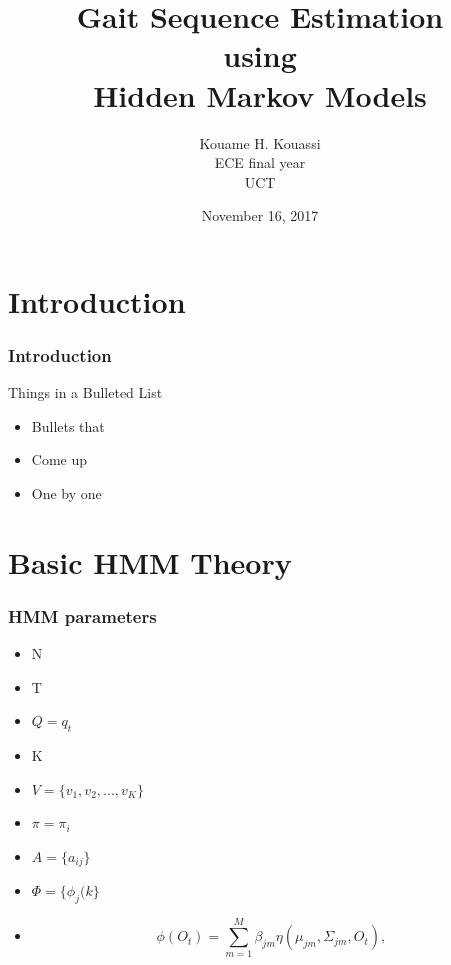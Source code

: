 \documentclass[serif,mathserif]{beamer}
\author[Kouame Kouassi]{Kouame H. Kouassi\\ \quad ECE final year\\ \quad UCT}
\title[Short Title\hspace{2em}\insertframenumber/\inserttotalframenumber]{Gait Sequence Estimation \\using \\Hidden Markov Models}
\date{November 16, 2017} %
\institute{Final year project presentation}
\begin{document}
\maketitle

 \section{Introduction}  %


\begin{frame}
  \frametitle{Introduction}
  Things in a Bulleted List\pause
  \begin{itemize}
  \item Bullets that\pause
  \item Come up\pause
  \item One by one %
  \end{itemize}
\end{frame}

\section{Basic HMM Theory} %

\begin{frame}
  \frametitle{HMM parameters}
  \begin{itemize}
  	\item N  \pause%
  	\item T \pause%
  	\item \(Q = {q_t}\) \pause%
  	\item K \pause%
  	\item \(V = \{v_1, v_2, ..., v_K\}\) \pause%
  	\item \(\pi = {\pi_i}\) \pause 	 %
  	\item \(A =  \{a_{ij} \}\) \pause%
  	\item \(\Phi =   \{ \phi_{j}(k\}\) \pause%
  	\item 
    \begin{equation*}
      	\phi(O_t) = \sum_{m=1}^M \beta_{jm} \eta(\mu_{jm}, \Sigma_{jm}, O_t), \label{eq:phi}
    \end{equation*}
  \end{itemize}
\end{frame}
\end{document}
